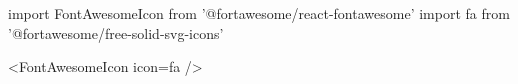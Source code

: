 import { FontAwesomeIcon } from '@fortawesome/react-fontawesome'
import { fa } from '@fortawesome/free-solid-svg-icons'

<FontAwesomeIcon icon={fa} />





